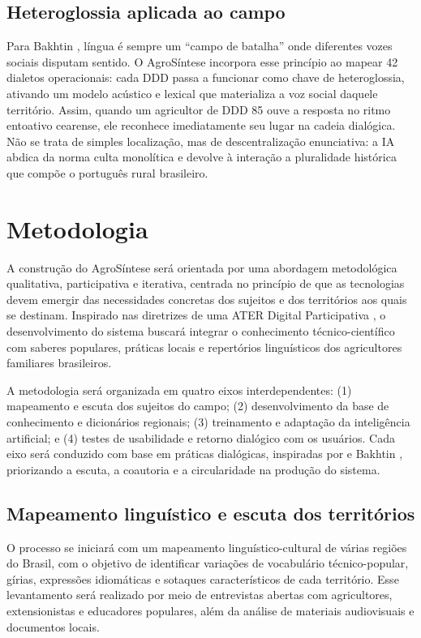 \section{Heteroglossia aplicada ao campo}
Para Bakhtin \cite{bakhtin2010poetica}, língua é sempre um “campo de batalha” onde diferentes vozes sociais disputam sentido. O AgroSíntese incorpora esse princípio ao mapear 42 dialetos operacionais: cada DDD passa a funcionar como chave de heteroglossia, ativando um modelo acústico e lexical que materializa a voz social daquele território. Assim, quando um agricultor de DDD 85 ouve a resposta no ritmo entoativo cearense, ele reconhece imediatamente seu lugar na cadeia dialógica. Não se trata de simples localização, mas de descentralização enunciativa: a IA abdica da norma culta monolítica e devolve à interação a pluralidade histórica que compõe o português rural brasileiro.


\chapter{Metodologia}

A construção do AgroSíntese será orientada por uma abordagem metodológica qualitativa, participativa e iterativa, centrada no princípio de que as tecnologias devem emergir das necessidades concretas dos sujeitos e dos territórios aos quais se destinam. Inspirado nas diretrizes de uma ATER Digital Participativa \cite{lopes2022}, o desenvolvimento do sistema buscará integrar o conhecimento técnico-científico com saberes populares, práticas locais e repertórios linguísticos dos agricultores familiares brasileiros.

A metodologia será organizada em quatro eixos interdependentes: (1) mapeamento e escuta dos sujeitos do campo; (2) desenvolvimento da base de conhecimento e dicionários regionais; (3) treinamento e adaptação da inteligência artificial; e (4) testes de usabilidade e retorno dialógico com os usuários. Cada eixo será conduzido com base em práticas dialógicas, inspiradas por \cite{freire2013extensao}  e Bakhtin \cite{bakhtin1997estetica}, priorizando a escuta, a coautoria e a circularidade na produção do sistema.

\section{Mapeamento linguístico e escuta dos territórios}

O processo se iniciará com um mapeamento linguístico-cultural de várias regiões do Brasil, com o objetivo de identificar variações de vocabulário técnico-popular, gírias, expressões idiomáticas e sotaques característicos de cada território. Esse levantamento será realizado por meio de entrevistas abertas com agricultores, extensionistas e educadores populares, além da análise de materiais audiovisuais e documentos locais.

